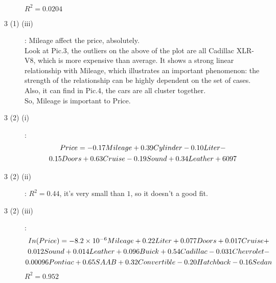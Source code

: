 \documentclass[UTF8]{ctexart}
\begin{document}
\begin{description}
$R^2 = 0.0204$
\item[3 (1) (iii)]: 
Mileage affect the price, absolutely.\\
Look at Pic.3, the outliers on the above of the plot are all Cadillac XLR-V8, which is more expensive than average. It shows a strong linear relationship with Mileage, which illustrates an important phenomenon: the strength of the relationship can be highly dependent on the set of cases. Also, it can find in Pic.4, the cars are all cluster together.\\
So, Mileage is important to Price.\\
\item[3 (2) (i)]:
\begin{multline}
$$Price = -0.17Mileage +0.39Cylinder -0.10Liter-\\0.15Doors + 0.63Cruise -0.19Sound +0.34Leather + 6097$$
\end{multline}
\item[3 (2) (ii)]:
$R^2 = 0.44$, it's very small than $1$, so it doesn't a good fit.
\item[3 (2) (iii)]:
\begin{multline}
$$In(Price) = -8.2\times10^{-6}Mileage+0.22Liter+0.077Doors+0.017Cruise+\\0.012Sound+0.014Leather+0.096Buick+0.54Cadillac-0.031Chevrolet-\\0.00096Pontiac+0.65SAAB+0.32Convertible-0.20Hatchback-0.16Sedan$$
\end{multline}
$R^2 = 0.952$
\end{description}
\end{document}
